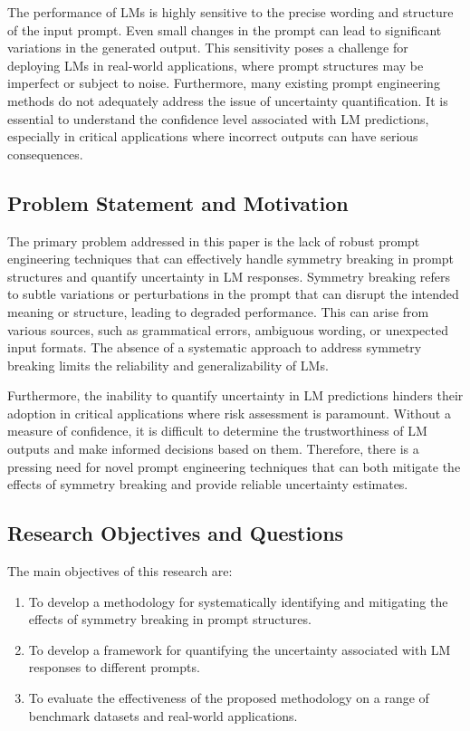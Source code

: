 \documentclass{article}
\begin{document}
The performance of LMs is highly sensitive to the precise wording and structure of the input prompt. Even small changes in the prompt can lead to significant variations in the generated output. This sensitivity poses a challenge for deploying LMs in real-world applications, where prompt structures may be imperfect or subject to noise. Furthermore, many existing prompt engineering methods do not adequately address the issue of uncertainty quantification. It is essential to understand the confidence level associated with LM predictions, especially in critical applications where incorrect outputs can have serious consequences.

\subsection{Problem Statement and Motivation}
The primary problem addressed in this paper is the lack of robust prompt engineering techniques that can effectively handle symmetry breaking in prompt structures and quantify uncertainty in LM responses. Symmetry breaking refers to subtle variations or perturbations in the prompt that can disrupt the intended meaning or structure, leading to degraded performance. This can arise from various sources, such as grammatical errors, ambiguous wording, or unexpected input formats. The absence of a systematic approach to address symmetry breaking limits the reliability and generalizability of LMs.

Furthermore, the inability to quantify uncertainty in LM predictions hinders their adoption in critical applications where risk assessment is paramount. Without a measure of confidence, it is difficult to determine the trustworthiness of LM outputs and make informed decisions based on them. Therefore, there is a pressing need for novel prompt engineering techniques that can both mitigate the effects of symmetry breaking and provide reliable uncertainty estimates.

\subsection{Research Objectives and Questions}
The main objectives of this research are:

\begin{enumerate}
    \item To develop a methodology for systematically identifying and mitigating the effects of symmetry breaking in prompt structures.
    \item To develop a framework for quantifying the uncertainty associated with LM responses to different prompts.
    \item To evaluate the effectiveness of the proposed methodology on a range of benchmark datasets and real-world applications.
\end{enumerate}
\end{document}
